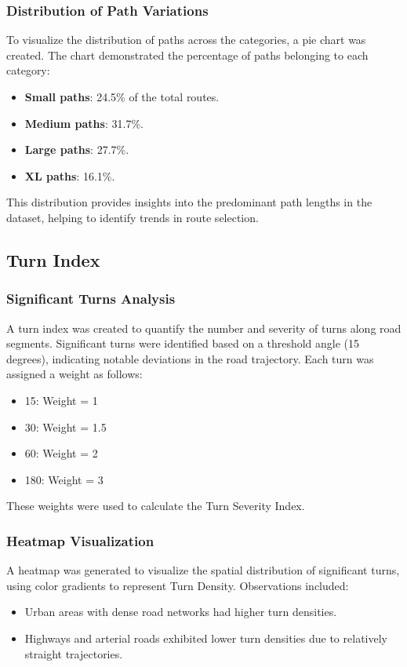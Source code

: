 \subsubsection{Distribution of Path Variations}
To visualize the distribution of paths across the categories, a pie chart was created. The chart demonstrated the percentage of paths belonging to each category:
\begin{itemize}
    \item \textbf{Small paths}: 24.5\% of the total routes.
    \item \textbf{Medium paths}: 31.7\%.
    \item \textbf{Large paths}: 27.7\%.
    \item \textbf{XL paths}: 16.1\%.
\end{itemize}
This distribution provides insights into the predominant path lengths in the dataset, helping to identify trends in route selection.

\subsection{Turn Index}
\subsubsection{Significant Turns Analysis}
A turn index was created to quantify the number and severity of turns along road segments. Significant turns were identified based on a threshold angle (15 degrees), indicating notable deviations in the road trajectory. Each turn was assigned a weight as follows:
\begin{itemize}
    \item 15\degree: Weight = 1
    \item 30\degree: Weight = 1.5
    \item 60\degree: Weight = 2
    \item 180\degree: Weight = 3
\end{itemize}
These weights were used to calculate the Turn Severity Index.

\subsubsection{Heatmap Visualization}
A heatmap was generated to visualize the spatial distribution of significant turns, using color gradients to represent Turn Density. Observations included:
\begin{itemize}
    \item Urban areas with dense road networks had higher turn densities.
    \item Highways and arterial roads exhibited lower turn densities due to relatively straight trajectories.
\end{itemize}

